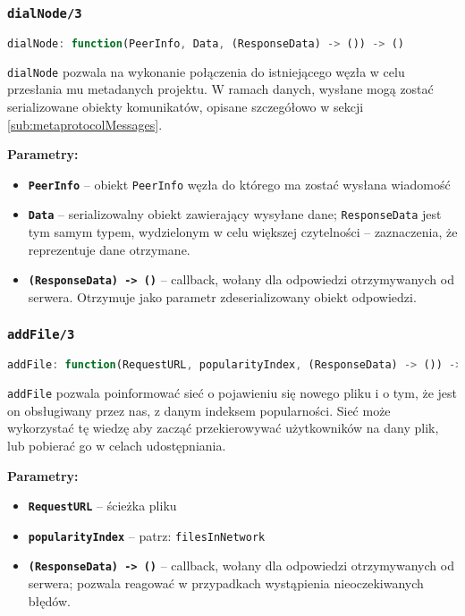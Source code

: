 % 

\subsubsection{\texttt{dialNode/3}}
\begin{lstlisting}[language=javascript]
    dialNode: function(PeerInfo, Data, (ResponseData) -> ()) -> ()
\end{lstlisting}
\texttt{dialNode} pozwala na wykonanie połączenia do istniejącego węzła w celu przesłania mu metadanych projektu. W ramach danych, wysłane mogą zostać serializowane obiekty komunikatów, opisane szczegółowo w sekcji \ref{sub:metaprotocolMessages}.

\textbf{Parametry:}
\begin{itemize}
    \item \textbf{\texttt{PeerInfo}} -- obiekt \texttt{PeerInfo} węzła do którego ma zostać wysłana wiadomość
    \item \textbf{\texttt{Data}} -- serializowalny obiekt zawierający wysyłane dane; \texttt{ResponseData} jest tym samym typem, wydzielonym w celu większej czytelności -- zaznaczenia, że reprezentuje dane otrzymane.
    \item \textbf{\texttt{(ResponseData) -> ()}} -- callback, wołany dla odpowiedzi otrzymywanych od serwera. Otrzymuje jako parametr zdeserializowany obiekt odpowiedzi.
\end{itemize}

% 

\subsubsection{\texttt{addFile/3}}
\begin{lstlisting}[language=javascript]
    addFile: function(RequestURL, popularityIndex, (ResponseData) -> ()) -> ()
\end{lstlisting}
\texttt{addFile} pozwala poinformować sieć o pojawieniu się nowego pliku i o tym, że jest on obsługiwany przez nas, z danym indeksem popularności. Sieć może wykorzystać tę wiedzę aby zacząć przekierowywać użytkowników na dany plik, lub pobierać go w celach udostępniania.

\textbf{Parametry:}
\begin{itemize}
    \item \textbf{\texttt{RequestURL}} -- ścieżka pliku
    \item \textbf{\texttt{popularityIndex}} -- patrz: \texttt{filesInNetwork}
    \item \textbf{\texttt{(ResponseData) -> ()}} -- callback, wołany dla odpowiedzi otrzymywanych od serwera; pozwala reagować w przypadkach wystąpienia nieoczekiwanych błędów.
\end{itemize}

